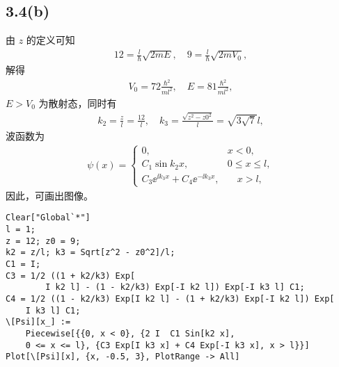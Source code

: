 \subsection{3.4(b)}
由 $z$ 的定义可知
\begin{align}
    12 = \frac{l}{\hbar} \sqrt{2mE}, \quad 9 = \frac {l}{\hbar} \sqrt{2mV_0},
\end{align}
解得
\begin{align}
    V_0 = 72 \frac{\hbar^2}{ml^2}, \quad E = 81 \frac{\hbar^2}{ml^2},
\end{align}
$E > V_0$ 为散射态，同时有
\begin{align}
    k_2 = \frac zl = \frac{12}l, \quad k_3 = \frac{\sqrt{z^2-z0^2}}l = \sqrt{3\sqrt7}l,
\end{align}
波函数为
\begin{align}
    \psi(x) = \begin{cases}
        0, \quad & x < 0, \\
        C_1 \sin k_2 x, \quad & 0 \leqslant x \leqslant l, \\
        C_3 \ee^{\ii k_3 x} + C_4 \ee^{-\ii k_3 x}, &\quad x > l,
    \end{cases}
\end{align}
因此，可画出图像。
\begin{lstlisting}
Clear["Global`*"]
l = 1;
z = 12; z0 = 9;
k2 = z/l; k3 = Sqrt[z^2 - z0^2]/l;
C1 = I;
C3 = 1/2 ((1 + k2/k3) Exp[
        I k2 l] - (1 - k2/k3) Exp[-I k2 l]) Exp[-I k3 l] C1;
C4 = 1/2 ((1 - k2/k3) Exp[I k2 l] - (1 + k2/k3) Exp[-I k2 l]) Exp[
    I k3 l] C1;
\[Psi][x_] := 
    Piecewise[{{0, x < 0}, {2 I  C1 Sin[k2 x], 
    0 <= x <= l}, {C3 Exp[I k3 x] + C4 Exp[-I k3 x], x > l}}]
Plot[\[Psi][x], {x, -0.5, 3}, PlotRange -> All]
\end{lstlisting}

